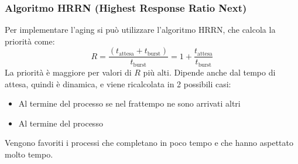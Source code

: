 \documentclass[a4paper]{article}
\begin{document}
\subsubsection{Algoritmo HRRN (Highest Response Ratio Next)}
Per implementare l'aging si può utilizzare l'algoritmo HRRN, che calcola la priorità
come:
\[
  R = \frac{\left( t_{\text{attesa}} + t_{\text{burst}} \right)}
  {t_{\text{burst}}}
  = 1 + \frac{t_{\text{attesa}}}{t_{\text{burst}}}
\] 
La priorità è maggiore per valori di \( R \) più alti. Dipende anche dal tempo
di attesa, quindi è dinamica, e viene ricalcolata in 2 possibili casi:
\begin{itemize}
  \item Al termine del processo se nel frattempo ne sono arrivati altri
  \item Al termine del processo
\end{itemize}

\vspace{1em}
\noindent
Vengono favoriti i processi che completano in poco tempo e che hanno aspettato molto
tempo.
\end{document}
